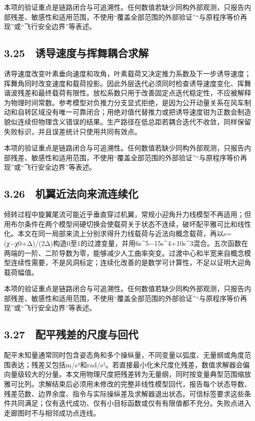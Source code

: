 \documentclass[UTF8,12pt,openany]{ctexbook}
\begin{document}
本项的验证重点是链路闭合与可追溯性。任何数值若缺少同构外部观测，只报告内部残差、敏感性和适用范围，不使用“覆盖全部范围的外部验证”“与原程序等价再现”或“飞行安全边界”等表述。

\subsection{3.25　诱导速度与挥舞耦合求解}

诱导速度改变叶素垂向速度和攻角，叶素载荷又决定推力系数及下一步诱导速度；挥舞角同时改变速度和载荷投影。因此外层迭代必须同时检查诱导速度变化、挥舞谐波残差和最终载荷有限性。放松系数只用于改善固定点迭代稳定性，不应被解释为物理时间常数。参考模型对负推力分支显式拒绝，是因为公开动量关系在风车制动和自转区域没有唯一可靠闭合；用绝对值代替推力或把诱导速度钳为正数会制造貌似连续但物理含义错误的结果。生产路径在低总距若耦合迭代不收敛，同样保留失败标识，并且误差统计只使用共同有效点。

本项的验证重点是链路闭合与可追溯性。任何数值若缺少同构外部观测，只报告内部残差、敏感性和适用范围，不使用“覆盖全部范围的外部验证”“与原程序等价再现”或“飞行安全边界”等表述。

\subsection{3.26　机翼近法向来流连续化}

倾转过程中旋翼尾流可能近乎垂直穿过机翼，常规小迎角升力线模型不再适用；但用布尔条件在两个模型间硬切换会使载荷关于状态不连续，破坏配平雅可比和线性化。本文在同一局部来流上分别求得升力线载荷与近法向概念载荷，再以s=(χ−χ0+Δ)/(2Δ)构造0至1的过渡变量，并用6s^5−15s^4+10s^3混合。五次函数在两端的一阶、二阶导数为零，能够减少人工曲率突变。过渡中心和半宽来自概念模型连续性需要，不是风洞标定；连续化改善的是数学可计算性，不足以证明大迎角载荷幅值。

本项的验证重点是链路闭合与可追溯性。任何数值若缺少同构外部观测，只报告内部残差、敏感性和适用范围，不使用“覆盖全部范围的外部验证”“与原程序等价再现”或“飞行安全边界”等表述。

\subsection{3.27　配平残差的尺度与回代}

配平未知量通常同时包含姿态角和多个操纵量，不同变量以弧度、无量纲或角度范围表达；残差又包括m/s²和rad/s²。若直接最小化未尺度化残差，数值求解器会偏向量级较大的分量。本文用物理尺度把残差转为无量纲，同时按变量典型范围缩放雅可比列。求解结束后必须用未修改的完整非线性模型回代，报告每个状态导数、残差范数、边界余度、指令与实际操纵差及求解器退出状态。可信标签要求这些条件共同满足；仅有迭代成功、仅有小目标函数或仅有有限值都不充分。失败点进入走廊图时不与相邻成功点连线。
\end{document}
